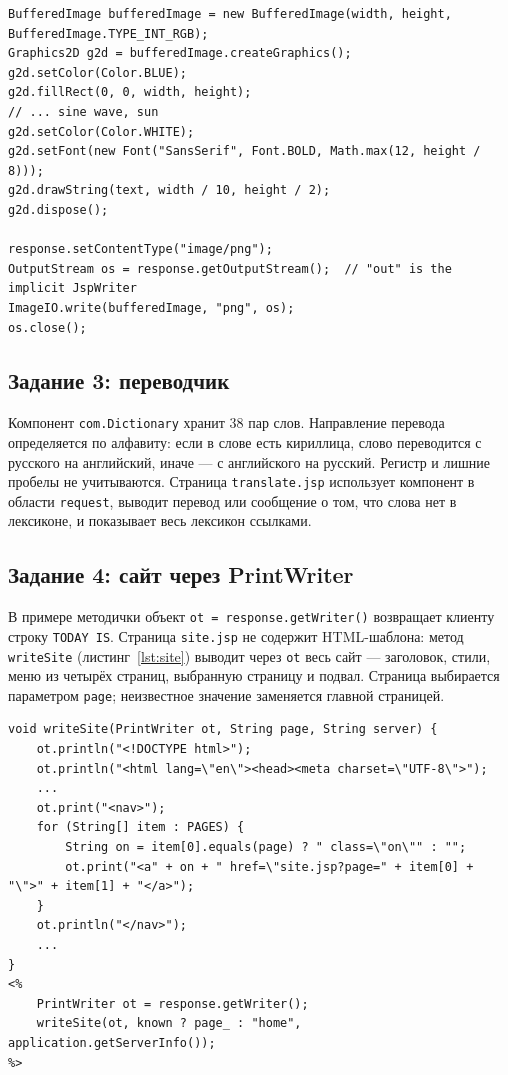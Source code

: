 \documentclass[14pt,a4paper]{extarticle}
\begin{document}
\begin{lstlisting}[style=java, caption={Страница ImageServlet.jsp (фрагмент)}, label={lst:image}]
BufferedImage bufferedImage = new BufferedImage(width, height, BufferedImage.TYPE_INT_RGB);
Graphics2D g2d = bufferedImage.createGraphics();
g2d.setColor(Color.BLUE);
g2d.fillRect(0, 0, width, height);
// ... sine wave, sun
g2d.setColor(Color.WHITE);
g2d.setFont(new Font("SansSerif", Font.BOLD, Math.max(12, height / 8)));
g2d.drawString(text, width / 10, height / 2);
g2d.dispose();

response.setContentType("image/png");
OutputStream os = response.getOutputStream();  // "out" is the implicit JspWriter
ImageIO.write(bufferedImage, "png", os);
os.close();
\end{lstlisting}

\subsection{Задание 3: переводчик}

Компонент \texttt{com.Dictionary} хранит 38 пар слов. Направление перевода
определяется по алфавиту: если в слове есть кириллица, слово переводится с русского на
английский, иначе --- с английского на русский. Регистр и лишние пробелы не
учитываются. Страница \texttt{translate.jsp} использует компонент в области
\texttt{request}, выводит перевод или сообщение о том, что слова нет в лексиконе, и
показывает весь лексикон ссылками.

\subsection{Задание 4: сайт через PrintWriter}

В примере методички объект \texttt{ot = response.getWriter()} возвращает клиенту строку
\texttt{TODAY IS}. Страница \texttt{site.jsp} не содержит HTML-шаблона: метод
\texttt{writeSite} (листинг~\ref{lst:site}) выводит через \texttt{ot} весь сайт ---
заголовок, стили, меню из четырёх страниц, выбранную страницу и подвал. Страница
выбирается параметром \texttt{page}; неизвестное значение заменяется главной страницей.

\begin{lstlisting}[style=java, caption={Вывод сайта через PrintWriter}, label={lst:site}]
void writeSite(PrintWriter ot, String page, String server) {
    ot.println("<!DOCTYPE html>");
    ot.println("<html lang=\"en\"><head><meta charset=\"UTF-8\">");
    ...
    ot.print("<nav>");
    for (String[] item : PAGES) {
        String on = item[0].equals(page) ? " class=\"on\"" : "";
        ot.print("<a" + on + " href=\"site.jsp?page=" + item[0] + "\">" + item[1] + "</a>");
    }
    ot.println("</nav>");
    ...
}
<%
    PrintWriter ot = response.getWriter();
    writeSite(ot, known ? page_ : "home", application.getServerInfo());
%>
\end{lstlisting}
\end{document}
